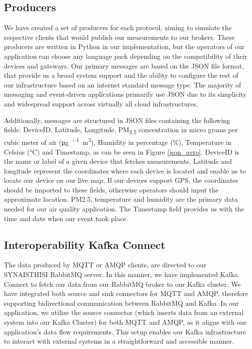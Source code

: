 \subsection{Producers}
We have created a set of producers for each protocol, aiming to simulate the respective clients that would publish our measurements to our brokers. These producers are written in Python in our implementation, but the operators of our application can choose any language pack depending on the compatibility of their devices and gateways. Our primary messages are based on the JSON file format, that provide us a broad system support and the ability to configure the rest of our infrastructure based on an internet standard message type. The majority of messaging and event-driven applications primarily use JSON due to its simplicity and widespread support across virtually all cloud infrastructures.

\label{producers}
Additionally, messages are structured in JSON files containing the following fields: DeviceID, Latitude, Longitude, PM\textsubscript{2.5} concentration in micro grams per cubic meter of air (\si{\micro\gram\per\/\cubic\meter}), Humidity in percentage (\%), Temperature in Celsius (\si{\celsius}) and Timestamp, as can be seen in Figure \ref{json_avro}. DeviceID is the name or label of a given device that fetches measurements. Latitude and longitude represent the coordinates where each device is located and enable us to locate our device on our live map. If our devices support GPS, the coordinates should be imported to these fields, otherwise operators should input the approximate location. PM2.5, temperature and humidity are the primary data needed for our air quality application. The Timestamp field provides us with the time and date when our event took place.

\subsection{Interoperability Kafka Connect }
The data produced by MQTT or AMQP clients, are directed to our SYNAISTHISI RabbitMQ server. In this manner, we have implemented Kafka Connect to fetch our data from our RabbitMQ broker to our Kafka cluster. We have integrated both source and sink connectors for MQTT and AMQP, therefore supporting bidirectional communication between RabbitMQ and Kafka. In our application, we utilize the source connector (which inserts data from an external system into our Kafka Cluster) for both MQTT and AMQP, as it aligns with our application's data flow requirements. This setup enables our Kafka infrastructure to interact with external systems in a straightforward and accessible manner.

